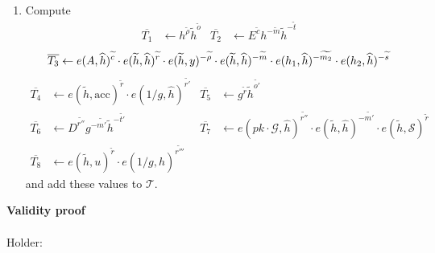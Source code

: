 \begin{enumerate}
\item Compute 
\begin{align}
\overline{T_1}&\leftarrow h^{\widetilde{\rho}} \widetilde{h}^{\widetilde{o}} &
\overline{T_2}&\leftarrow E^{\widetilde{c}}h^{-\widetilde{m}}\widetilde{h}^{-\widetilde{t}}
\end{align}
\begin{equation}
\overline{T_3}\leftarrow e(A,\widehat{h})^{\widetilde{c}}\cdot e(\widetilde{h},\widehat{h})^{\widetilde{r}}\cdot
e(\widetilde{h},y)^{-\widetilde{\rho}}\cdot
e(\widetilde{h},\widehat{h})^{-\widetilde{m}}\cdot
e(h_1,\widehat{h})^{-\widetilde{m_2}}\cdot e(h_2,\widehat{h})^{-\widetilde{s}}\\
\end{equation}
\begin{align}
\overline{T_4}&\leftarrow e(\widetilde{h},\mathrm{acc})^{\widetilde{r}}\cdot
e(1/g,\widehat{h})^{\widetilde{r'}}&
\overline{T_5}&\leftarrow g^{\widetilde{r}}\widetilde{h}^{\widetilde{o'}}\\
\overline{T_6}&\leftarrow D^{\widetilde{r''}}g^{-\widetilde{m'}}
\widetilde{h}^{-\widetilde{t'}}&
\overline{T_7}&\leftarrow e(pk\cdot \mathcal{G},\widehat{h})^{\widetilde{r''}}\cdot 
e(\widetilde{h},\widehat{h})^{-\widetilde{m'}}\cdot
e(\widetilde{h},\mathcal{S})^{\widetilde{r}}\\
\overline{T_8}&\leftarrow e(\widetilde{h},u)^{\widetilde{r}}
\cdot e(1/g,\widehat{h})^{\widetilde{r'''}}
\end{align}
and add these values to $\mathcal{T}$.
\end{enumerate}
\textbf{Validity proof}\\
\\Holder:
